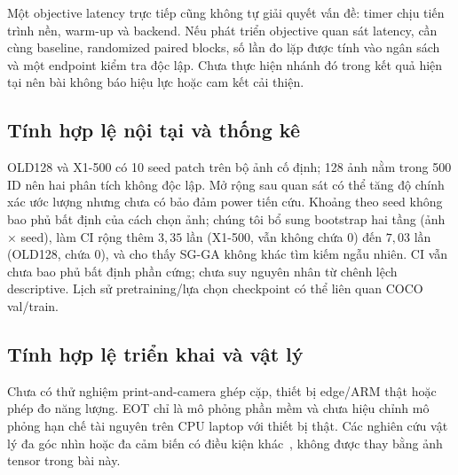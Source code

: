 \documentclass[a4paper,fleqn]{cas-dc}
\newif\ifbranchB
\begin{document}
Một objective latency trực tiếp cũng không tự giải quyết vấn đề: timer chịu tiến trình nền, warm-up và backend. Nếu phát triển objective quan sát latency, cần cùng baseline, randomized paired blocks, số lần đo lặp được tính vào ngân sách và một endpoint kiểm tra độc lập. Chưa thực hiện nhánh đó trong kết quả hiện tại nên bài không báo hiệu lực hoặc cam kết cải thiện.

\subsection{Tính hợp lệ nội tại và thống kê}

OLD128 và X1-500 có 10 seed patch trên bộ ảnh cố định; 128 ảnh nằm trong 500 ID nên hai phân tích không độc lập. Mở rộng sau quan sát có thể tăng độ chính xác ước lượng nhưng chưa có bảo đảm power tiến cứu. Khoảng theo seed không bao phủ bất định của cách chọn ảnh; chúng tôi bổ sung bootstrap hai tầng (ảnh $\times$ seed), làm CI rộng thêm $3{,}35$ lần (X1-500, vẫn không chứa 0) đến $7{,}03$ lần (OLD128, chứa 0), và cho thấy SG-GA không khác tìm kiếm ngẫu nhiên. CI vẫn chưa bao phủ bất định phần cứng; chưa suy nguyên nhân từ chênh lệch descriptive. Lịch sử pretraining/lựa chọn checkpoint có thể liên quan COCO val/train.
\ifbranchB
Nhánh A có 10 patch seeds trên một tập ảnh cố định, nhánh B có năm training seeds trên một split. Các khoảng theo seed không bao phủ độ bất định của cách chọn ảnh, split hoặc phần cứng. Việc chọn checkpoint và sweet spot theo validation còn tạo một lớp lựa chọn; CI thông thường ở mốc được chọn chưa hiệu chỉnh toàn bộ quy trình lựa chọn. Các chênh lệch descriptive không được biến thành chứng minh nhân quả hoặc tương đương chỉ vì p không nhỏ.

Pretraining và snapshot selection có thể từng dùng COCO val/train. Trong nhánh person, tách theo ảnh chưa bảo đảm tách người/video; các ảnh gần trùng có thể tồn tại dù SHA-256 khác. Cùng hyperparameter chưa chắc tối ưu cho mọi kiến trúc, còn cùng ngân sách wall-clock có thể cho số epoch và bước optimizer khác nhau. Vì thế, benchmark đo cả architecture, initialization, implementation và lịch fine-tuning như một cấu hình kết hợp.
\fi

\subsection{Tính hợp lệ triển khai và vật lý}

Chưa có thử nghiệm print-and-camera ghép cặp, thiết bị edge/ARM thật hoặc phép đo năng lượng. EOT chỉ là mô phỏng phần mềm và chưa hiệu chỉnh mô phỏng hạn chế tài nguyên trên CPU laptop với thiết bị thật. Các nghiên cứu vật lý đa góc nhìn hoặc đa cảm biến có điều kiện khác~\cite{grac2025,norp2026,thermalcloth2026}, không được thay bằng ảnh tensor trong bài này.
\end{document}
